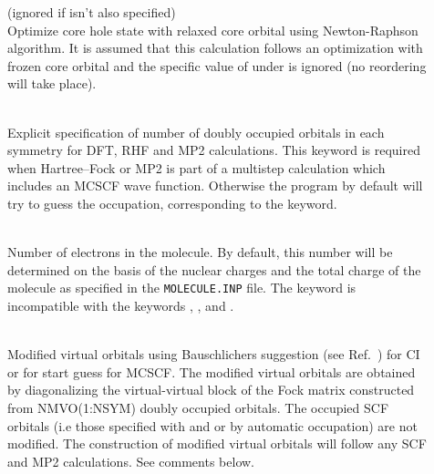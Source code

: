 \begin{description}
\item[]
  (ignored if  isn't also specified)\\
  Optimize core hole state with relaxed
  core orbital using Newton-Raphson algorithm.
  It is assumed that this calculation follows an optimization
  with frozen core orbital and the specific value of
   under  is ignored (no
  reordering will take place).


\item[]
     \\
  Explicit specification of number of doubly occupied orbitals in each symmetry
  for DFT, RHF and MP2 calculations. This keyword
  is required when Hartree--Fock or MP2 is part of a multistep
  calculation which includes an MCSCF wave function. 
  Otherwise the program by default will try to guess the occupation,
  corresponding to the   keyword.

\item[]
   \\
  Number of electrons in the molecule.
  By default, this number will be determined on the basis of the nuclear
  charges and the total charge of the molecule
  as specified in the \verb|MOLECULE.INP| file.
  The keyword is incompatible with the keywords ,
  , and .

\item[]
   \\
  Modified virtual orbitals using Bauschlichers suggestion
  (see Ref.~\cite{cwbjcp72})
  for CI or for start guess for MCSCF. The modified virtual orbitals
  are obtained by  diagonalizing the virtual-virtual
  block of the Fock matrix constructed from NMVO(1:NSYM) doubly
  occupied orbitals.
  The occupied SCF orbitals (i.e those specified with
   and 
  or by automatic occupation) are not modified.
  The construction of modified virtual orbitals
  will follow any SCF and MP2 calculations.
  See comments below.


\end{description}
